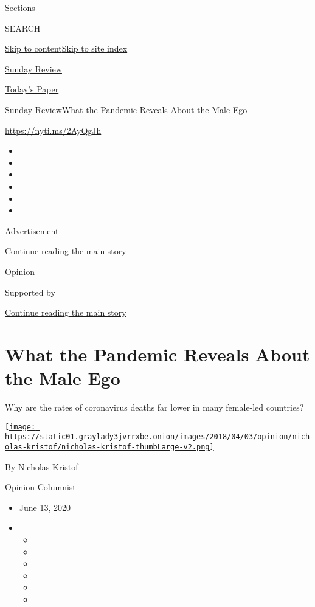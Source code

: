 Sections

SEARCH

\protect\hyperlink{site-content}{Skip to
content}\protect\hyperlink{site-index}{Skip to site index}

\href{https://www.nytimes3xbfgragh.onion/section/opinion/sunday}{Sunday
Review}

\href{https://myaccount.nytimes3xbfgragh.onion/auth/login?response_type=cookie\&client_id=vi}{}

\href{https://www.nytimes3xbfgragh.onion/section/todayspaper}{Today's
Paper}

\href{/section/opinion/sunday}{Sunday Review}\textbar{}What the Pandemic
Reveals About the Male Ego

\url{https://nyti.ms/2AyQgJh}

\begin{itemize}
\item
\item
\item
\item
\item
\item
\end{itemize}

Advertisement

\protect\hyperlink{after-top}{Continue reading the main story}

\href{/section/opinion}{Opinion}

Supported by

\protect\hyperlink{after-sponsor}{Continue reading the main story}

\hypertarget{what-the-pandemic-reveals-about-the-male-ego}{%
\section{What the Pandemic Reveals About the Male
Ego}\label{what-the-pandemic-reveals-about-the-male-ego}}

Why are the rates of coronavirus deaths far lower in many female-led
countries?

\href{https://www.nytimes3xbfgragh.onion/column/nicholas-kristof}{\texttt{[image: https://static01.graylady3jvrrxbe.onion/images/2018/04/03/opinion/nicholas-kristof/nicholas-kristof-thumbLarge-v2.png]}}

By
\href{https://www.nytimes3xbfgragh.onion/column/nicholas-kristof}{Nicholas
Kristof}

Opinion Columnist

\begin{itemize}
\item
  June 13, 2020
\item
  \begin{itemize}
  \item
  \item
  \item
  \item
  \item
  \item
  \end{itemize}
\end{itemize}

